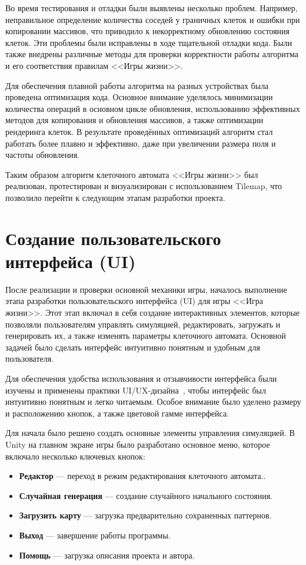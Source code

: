 Во время тестирования и отладки были выявлены несколько проблем. Например, неправильное определение количества соседей у граничных клеток и ошибки при копировании массивов, что приводило к некорректному обновлению состояния клеток. Эти проблемы были исправлены в ходе тщательной отладки кода. Были также внедрены различные методы для проверки корректности работы алгоритма и его соответствия правилам <<Игры жизни>>.

Для обеспечения плавной работы алгоритма на разных устройствах была проведена оптимизация кода. Основное внимание уделялось минимизации количества операций в основном цикле обновления, использованию эффективных методов для копирования и обновления массивов, а также оптимизации рендеринга клеток. В результате проведённых оптимизаций алгоритм стал работать более плавно и эффективно, даже при увеличении размера поля и частоты обновления.

Таким образом алгоритм клеточного автомата <<Игры жизни>> был реализован, протестирован и визуализирован с использованием Tilemap, что позволило перейти к следующим этапам разработки проекта.

\section{\label{sec:ch02/sec01/sub03}Создание пользовательского интерфейса (UI)}

После реализации и проверки основной механики игры, началось выполнение этапа разработки пользовательского интерфейса (UI) для игры <<Игра жизни>>. 
Этот этап включал в себя создание интерактивных элементов, которые позволяли пользователям управлять симуляцией, редактировать, загружать и генерировать их, а также изменять параметры клеточного автомата. Основной задачей было сделать интерфейс интуитивно понятным и удобным для пользователя.

Для обеспечения удобства использования и отзывчивости интерфейса были изучены и применены практики UI/UX-дизайна~\cite{UI/Ux}, чтобы интерфейс был интуитивно понятным и легко читаемым. Особое внимание было уделено размеру и расположению кнопок, а также цветовой гамме интерфейса.

Для начала было решено создать основные элементы управления симуляцией. В Unity на главном экране игры было разработано основное меню, которое включало несколько ключевых кнопок:
        \begin{itemize}
		\item \textbf{Редактор} --- переход в режим редактирования клеточного автомата..
		\item \textbf{Случайная генерация} --- создание случайного начального состояния. 
		\item\textbf{Загрузить карту} --- загрузка предварительно сохраненных паттернов. 
		\item \textbf{Выход} --- завершение работы программы.
            \item \textbf{Помощь} --- загрузка описания проекта и автора.
	\end{itemize}

